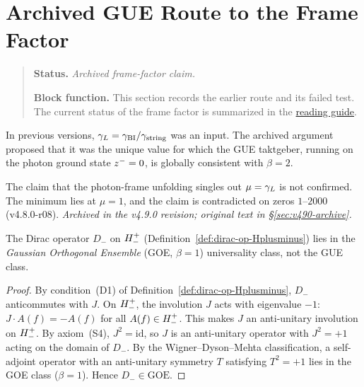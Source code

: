 
\section{Archived GUE Route to the Frame Factor}
\begin{quote}\small
\noindent\textbf{Status.} \emph{Archived frame-factor claim.}\par
\noindent\textbf{Block function.} This section records the earlier route and its failed test. The current status of the frame factor is summarized in the \hyperref[v480:reading-route]{reading guide}.
\end{quote}
\label{sec:gue-selfdet}

\begin{remark}
In previous versions, $\gamma_L = \gamma_{\mathrm{BI}}/\gamma_{\mathrm{string}}$ was an input.
The archived argument proposed that it was the unique value for which
the GUE taktgeber, running on the photon ground state $z^-=0$,
is globally consistent with $\beta=2$.
\end{remark}

\begin{theorem}\label{thm:gue-selfdet}
The claim that the photon-frame unfolding singles out \(\mu=\gamma_L\) is not confirmed.  The minimum lies at \(\mu=1\), and the claim is contradicted on zeros \(1\)--\(2000\) (v4.8.0-r08).
\emph{Archived in the v4.9.0 revision; original text in \S\ref{sec:v490-archive}.}
\end{theorem}

\begin{proposition}
\label{prop:goe-fermionic}
The Dirac operator $D_{-}$ on $H^+_-$ (Definition~\ref{def:dirac-op-Hplusminus})
lies in the \emph{Gaussian Orthogonal Ensemble} (GOE, $\beta=1$) universality
class, not the GUE class.
\end{proposition}

\begin{proof}
By condition~(D1) of Definition~\ref{def:dirac-op-Hplusminus}, $D_-$
anticommutes with $J$. On $H^+_-$, the involution $J$ acts with
eigenvalue $-1$: $J\cdot A(f) = -A(f)$ for all $A(f)\in H^+_-$.
This makes $J$ an anti-unitary involution on $H^+_-$.
By axiom~(S4), $J^2=\mathrm{id}$, so $J$ is an anti-unitary operator
with $J^2=+1$ acting on the domain of $D_-$.
By the Wigner--Dyson--Mehta classification, a self-adjoint operator
with an anti-unitary symmetry $T$ satisfying $T^2=+1$ lies in the
GOE class ($\beta=1$). Hence $D_-\in\mathrm{GOE}$.
\end{proof}

